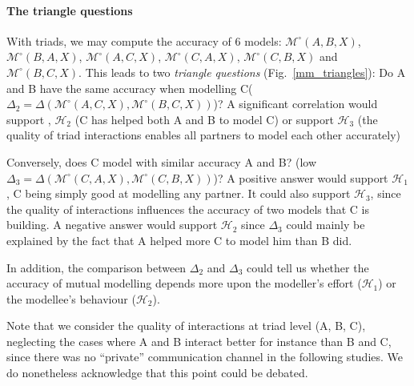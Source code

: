 \documentclass[natbib]{svjour3}
\newcommand{\A}{A\xspace}
\newcommand{\B}{B\xspace}
\newcommand{\C}{C\xspace}
\newcommand{\Model}[3]{{$\mathcal{M}^{\circ}(#1, #2, #3)$}}
\begin{document}
\paragraph{The triangle questions}

With triads, we may compute the accuracy of 6 models: \Model{A}{B}{X},
\Model{B}{A}{X}, \Model{A}{C}{X}, \Model{C}{A}{X}, \Model{C}{B}{X} and
\Model{B}{C}{X}. This leads to two \emph{triangle questions}
(Fig.~\ref{mm_triangles}): Do \A and \B have the same accuracy when modelling
\C ($\Delta_2 = \Delta(\mathcal{M}^{\circ}(A,C,X),
\mathcal{M}^{\circ}(B,C,X))$)? A significant correlation would support ,
$\mathcal{H}_{2}$  (C has helped both \A and \B to model C) or support
$\mathcal{H}_{3}$ (the quality of triad interactions enables all partners to
model each other accurately)  


Conversely, does \C model with similar accuracy \A and \B? (low $\Delta_3=
\Delta(\mathcal{M}^{\circ}(C,A,X), \mathcal{M}^{\circ}(C,B,X))$)? A positive
answer would support $\mathcal{H}_{1}$, \C being simply good at modelling any
partner.  It could also support  $\mathcal{H}_{3}$,  since the quality of
interactions influences the accuracy of two models that \C is building. A
negative answer would support $\mathcal{H}_{2}$ since $\Delta_3$ could mainly be
explained by the fact that  \A helped more \C to model him than \B did. 

In addition, the comparison between $\Delta_2$ and $\Delta_3$ could tell us
whether the accuracy of mutual modelling depends more upon the modeller's effort
($\mathcal{H}_{1}$) or the modellee's behaviour ($\mathcal{H}_{2}$).

Note that we consider the quality of interactions at triad level (\A, \B, \C),
neglecting the cases where \A and \B interact better for instance than \B and \C, since there
was no ``private'' communication channel in the following studies. We do
nonetheless acknowledge that this point could be debated.
\end{document}
